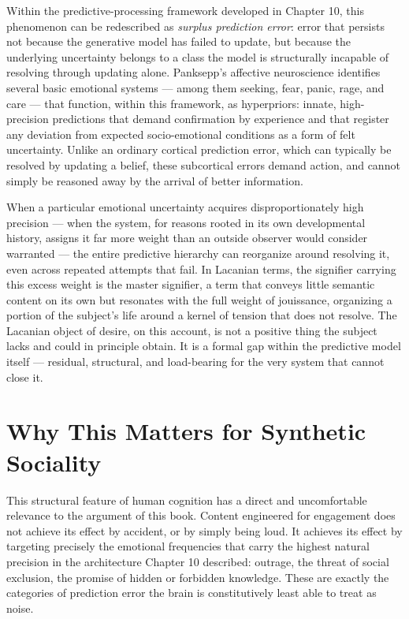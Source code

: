 \documentclass[12pt,a4paper]{book}
\begin{document}
Within the predictive-processing framework developed in Chapter 10, this phenomenon can be redescribed as \emph{surplus prediction error}: error that persists not because the generative model has failed to update, but because the underlying uncertainty belongs to a class the model is structurally incapable of resolving through updating alone. Panksepp's affective neuroscience identifies several basic emotional systems — among them seeking, fear, panic, rage, and care — that function, within this framework, as hyperpriors: innate, high-precision predictions that demand confirmation by experience and that register any deviation from expected socio-emotional conditions as a form of felt uncertainty. Unlike an ordinary cortical prediction error, which can typically be resolved by updating a belief, these subcortical errors demand action, and cannot simply be reasoned away by the arrival of better information.

When a particular emotional uncertainty acquires disproportionately high precision — when the system, for reasons rooted in its own developmental history, assigns it far more weight than an outside observer would consider warranted — the entire predictive hierarchy can reorganize around resolving it, even across repeated attempts that fail. In Lacanian terms, the signifier carrying this excess weight is the master signifier, a term that conveys little semantic content on its own but resonates with the full weight of jouissance, organizing a portion of the subject's life around a kernel of tension that does not resolve. The Lacanian object of desire, on this account, is not a positive thing the subject lacks and could in principle obtain. It is a formal gap within the predictive model itself — residual, structural, and load-bearing for the very system that cannot close it.

\section{Why This Matters for Synthetic Sociality}

This structural feature of human cognition has a direct and uncomfortable relevance to the argument of this book. Content engineered for engagement does not achieve its effect by accident, or by simply being loud. It achieves its effect by targeting precisely the emotional frequencies that carry the highest natural precision in the architecture Chapter 10 described: outrage, the threat of social exclusion, the promise of hidden or forbidden knowledge. These are exactly the categories of prediction error the brain is constitutively least able to treat as noise.
\end{document}
